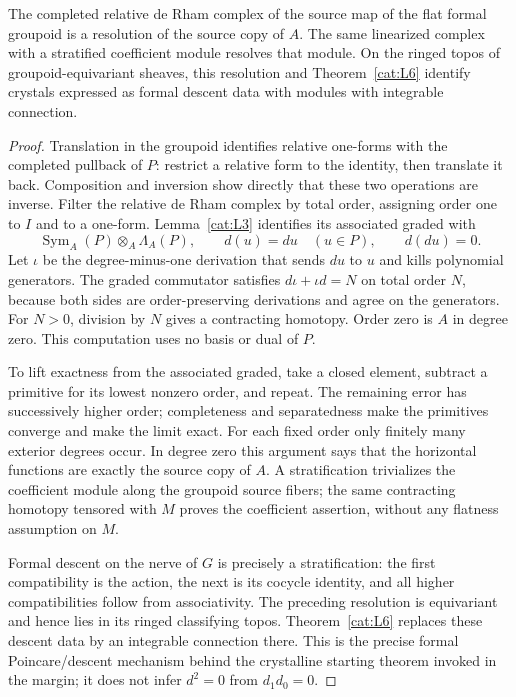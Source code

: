 \begin{proposition}\label{cat:L7}
The completed relative de Rham complex of the source map of the flat
formal groupoid is a resolution of the source copy of $A$.  The same
linearized complex with a stratified coefficient module resolves that
module.  On the ringed topos of groupoid-equivariant sheaves, this
resolution and Theorem~\ref{cat:L6} identify crystals expressed as
formal descent data with modules with integrable connection.
\end{proposition}
\begin{proof}
Translation in the groupoid identifies relative one-forms with the
completed pullback of $P$: restrict a relative form to the identity,
then translate it back.  Composition and inversion show directly
that these two operations are inverse.  Filter the relative de Rham
complex by total order, assigning order one to $I$ and to a one-form.
Lemma~\ref{cat:L3} identifies its associated graded with
\[
 \operatorname{Sym}_A(P)\otimes_A\Lambda_A(P),
 \qquad d(u)=du\quad(u\in P),\qquad d(du)=0.
\]
Let $\iota$ be the degree-minus-one derivation that sends $du$ to $u$
and kills polynomial generators.  The graded commutator satisfies
$d\iota+\iota d=N$ on total order $N$, because both sides are
order-preserving derivations and agree on the generators.
For $N>0$, division by $N$ gives a contracting homotopy.
Order zero is $A$ in degree zero.  This computation uses no basis
or dual of $P$.

To lift exactness from the associated graded, take a closed element,
subtract a primitive for its lowest nonzero order, and repeat.
The remaining error has successively higher order; completeness and
separatedness make the primitives converge and make the limit exact.
For each fixed order only finitely many exterior degrees occur.
In degree zero this argument says that the horizontal functions are
exactly the source copy of $A$.  A stratification trivializes the
coefficient module along the groupoid source fibers; the same
contracting homotopy tensored with $M$ proves the coefficient assertion,
without any flatness assumption on $M$.

Formal descent on the nerve of $G$ is precisely a stratification:
the first compatibility is the action, the next is its cocycle
identity, and all higher compatibilities follow from associativity.
The preceding resolution is equivariant and hence lies in its ringed
classifying topos.  Theorem~\ref{cat:L6} replaces these descent data
by an integrable connection there.  This is the precise formal
Poincare/descent mechanism behind the crystalline starting theorem
invoked in the margin; it does not infer $d^2=0$ from $d_1d_0=0$.
\end{proof}
